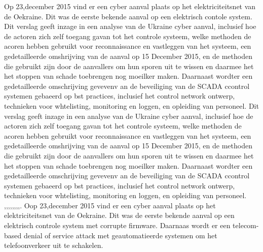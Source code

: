  Op 23,december 2015  vind er een cyber aanval plaats op het elektriciteitsnet van de Oekraine. Dit was de eerste bekende aanval op een elektrisch contole  system.  Dit verslag geeft inzage in een analyse van de Ukraine cyber aanval,
 inclusief hoe de actoren zich zelf toegang gavan tot het controle systeem, welke methoden de acoren hebben gebruikt voor reconnaissance en vastleggen van het systeem, een gedetailleerde omshrijving van de aanval op 15 December 2015, en de methoden die gebruikt zijn door de aanvallers om hun sporen uit te wissen en daarmee het het stoppen van schade toebrengen  nog moeilker maken. Daarnaast wordter  een gedetailleerde omschrijving gevevenv an de beveiliging van de SCADA ccontrol systemen gebaeerd op bst practices, inclusief het control network ontwerp, technieken voor whtelisting, monitoring en loggen, en  opleiding van personeel.
 \cite{Whitehead2017ukrainepoweroutage}
 \cite{noauthor_2022-nm}
 \cite{zetter2016GridHack}
 \cite{owens21032017ukrainemitigationstrategies}
 \cite{cerulus2019FrontlineRussiaAttack}
 \cite{grammatikis2019AttackIEC6087505104}
 \cite{hidajat2016ScadaSimulator}
 \cite{uscert20072021crashmalware}
 \cite{zetter12062017malwareanalysis}
 \cite{icsRussianHackingCyberWeapon}
 \cite{usgovC2M2}
 Dit verslag geeft inzage in een analyse van de Ukraine cyber aanval,
 inclusief hoe de actoren zich zelf toegang gavan tot het controle systeem, welke methoden de acoren hebben gebruikt voor reconnaissance en vastleggen van het systeem, een gedetailleerde omshrijving van de aanval op 15 December 2015, en de methoden die gebruikt zijn door de aanvallers om hun sporen uit te wissen en daarmee het het stoppen van schade toebrengen  nog moeilker maken. Daarnaast wordter  een gedetailleerde omschrijving gevevenv an de beveiliging van de SCADA ccontrol systemen gebaeerd op bst practices, inclusief het control network ontwerp, technieken voor whtelisting, monitoring en loggen, en  opleiding van personeel.
 \cite{Whitehead2017ukrainepoweroutage},\cite{zetter2016GridHack},\cite{boozallen2016lightwentout},\cite{finklejan2016UsBlamesRussianSandworm},\cite{desarnaud2017cyberattacks},\cite{caseli04112016intrusiondetectioncontrolsystem},\cite{rochascadatesting},\cite{hidajat2016ScadaSimulator},\cite{zetter2017moreDangerousMalware}.
 Oop 23,december 2015  vind er een cyber aanval plaats op het elektriciteitsnet van de Oekraine. Dit was de eerste bekende aanval op een elektrisch controle  system met corrupte firmware. Daarnaas wordt er een telecom-based denial of service attack met  geautomatieerde systemen om het telefoonverkeer uit te schakelen.
